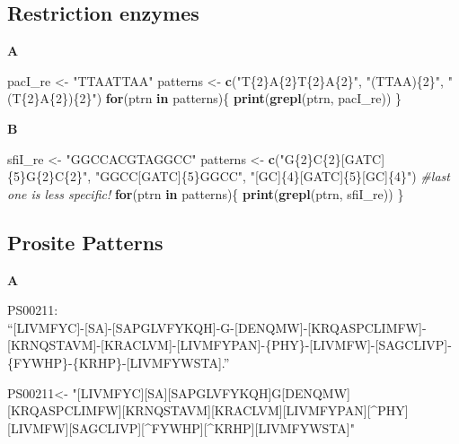 \documentclass[]{book}
\newenvironment{Shaded}{\begin{snugshade}}{\end{snugshade}}
\newcommand{\CommentTok}[1]{\textcolor[rgb]{0.56,0.35,0.01}{\textit{#1}}}
\newcommand{\ControlFlowTok}[1]{\textcolor[rgb]{0.13,0.29,0.53}{\textbf{#1}}}
\newcommand{\KeywordTok}[1]{\textcolor[rgb]{0.13,0.29,0.53}{\textbf{#1}}}
\newcommand{\NormalTok}[1]{#1}
\newcommand{\StringTok}[1]{\textcolor[rgb]{0.31,0.60,0.02}{#1}}
\begin{document}
\hypertarget{restriction-enzymes-1}{%
\subsection{Restriction enzymes}\label{restriction-enzymes-1}}

\textbf{A}

\begin{Shaded}
\begin{Highlighting}[]
\NormalTok{pacI_re <-}\StringTok{ "TTAATTAA"}
\NormalTok{patterns <-}\StringTok{ }\KeywordTok{c}\NormalTok{(}\StringTok{"T\{2\}A\{2\}T\{2\}A\{2\}"}\NormalTok{,}
           \StringTok{"(TTAA)\{2\}"}\NormalTok{, }
           \StringTok{"(T\{2\}A\{2\})\{2\}"}\NormalTok{)}
\ControlFlowTok{for}\NormalTok{(ptrn }\ControlFlowTok{in}\NormalTok{ patterns)\{}
    \KeywordTok{print}\NormalTok{(}\KeywordTok{grepl}\NormalTok{(ptrn, pacI_re))}
\NormalTok{\}}
\end{Highlighting}
\end{Shaded}

\textbf{B}

\begin{Shaded}
\begin{Highlighting}[]
\NormalTok{sfiI_re <-}\StringTok{ "GGCCACGTAGGCC"}
\NormalTok{patterns <-}\StringTok{ }\KeywordTok{c}\NormalTok{(}\StringTok{"G\{2\}C\{2\}[GATC]\{5\}G\{2\}C\{2\}"}\NormalTok{,}
           \StringTok{"GGCC[GATC]\{5\}GGCC"}\NormalTok{, }
           \StringTok{"[GC]\{4\}[GATC]\{5\}[GC]\{4\}"}\NormalTok{) }\CommentTok{#last one is less specific!}
\ControlFlowTok{for}\NormalTok{(ptrn }\ControlFlowTok{in}\NormalTok{ patterns)\{}
    \KeywordTok{print}\NormalTok{(}\KeywordTok{grepl}\NormalTok{(ptrn, sfiI_re))}
\NormalTok{\}}
\end{Highlighting}
\end{Shaded}

\hypertarget{prosite-patterns-1}{%
\subsection{Prosite Patterns}\label{prosite-patterns-1}}

\textbf{A}

PS00211:\\
``{[}LIVMFYC{]}-{[}SA{]}-{[}SAPGLVFYKQH{]}-G-{[}DENQMW{]}-{[}KRQASPCLIMFW{]}-{[}KRNQSTAVM{]}-{[}KRACLVM{]}-{[}LIVMFYPAN{]}-\{PHY\}-{[}LIVMFW{]}-{[}SAGCLIVP{]}-\{FYWHP\}-\{KRHP\}-{[}LIVMFYWSTA{]}.''

\begin{Shaded}
\begin{Highlighting}[]
\NormalTok{PS00211<-}\StringTok{ "[LIVMFYC][SA][SAPGLVFYKQH]G[DENQMW][KRQASPCLIMFW][KRNQSTAVM][KRACLVM][LIVMFYPAN][^PHY][LIVMFW][SAGCLIVP][^FYWHP][^KRHP][LIVMFYWSTA]"}
\end{Highlighting}
\end{Shaded}
\end{document}
